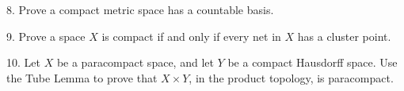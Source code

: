 \documentclass[12pt]{article}
\begin{document}
\begin{description}
\vspace{.1in}

\item[] 8.
Prove a compact metric space has a countable basis.

\vspace{.1in}

\item[] 9.
Prove a space $X$ is compact if and only if every net in $X$
has a cluster point.


\vspace{.1in}

\item[] 10.
Let $X$ be a paracompact space, and let $Y$ be a compact Hausdorff space.
Use the Tube Lemma to prove that $X\times Y$, in the product topology,
is paracompact.




\vfill

\end{description}
\end{document}
